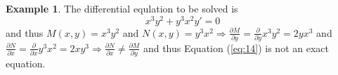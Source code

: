 \documentclass[10pt,a4paper]{article}
\theoremstyle{definition}
\newtheorem{example}[defn]{Example}
\begin{document}
\begin{example}
The differential equlation to be solved is
\begin{equation} \label{eq:14}
  x^3 y^2 + y^3 x^2 y' = 0
\end{equation}
and thus $M(x, y) = x^3 y^2$ and $N(x, y) = y^3 x^2 \Rightarrow \frac{\partial
M}{\partial y} = \frac{\partial}{\partial y} x^3 y^2 = 2 y x^3 $ and
$\frac{\partial N}{\partial x} = \frac{\partial}{\partial x} y^3 x^2 = 2 x y^3
\Rightarrow \frac{\partial N}{\partial x} \neq \frac{\partial M}{\partial y}$
and thus Equation (\ref{eq:14}) is not an exact equation.
\end{example}
\end{document}
